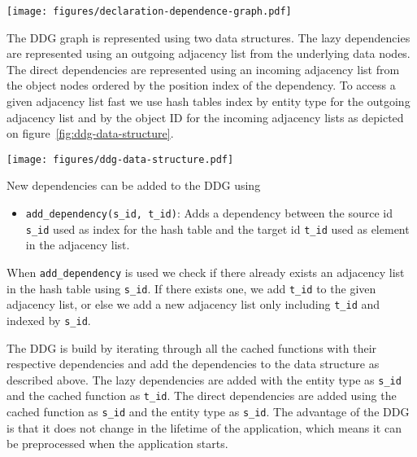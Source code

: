 \begin{figure*}[ht!]
  \centering
  \texttt{[image: figures/declaration-dependence-graph.pdf]}
  \caption{The Declaration Dependence Graph of the running example}
  \label{fig:declaration-dependence-graph}
\end{figure*}

The DDG graph is represented using two data structures. The lazy dependencies are represented using an outgoing adjacency list from the underlying data nodes. The direct dependencies are represented using an incoming adjacency list from the object nodes ordered by the position index of the dependency. To access a given adjacency list fast we use hash tables index by entity type for the outgoing adjacency list and by the object ID for the incoming adjacency lists as depicted on figure~\ref{fig:ddg-data-structure}.

\begin{figure*}[ht!]
  \centering
  \texttt{[image: figures/ddg-data-structure.pdf]}
  \caption{An illustration of the data structure representing the DDG on figure~\ref{fig:declaration-dependence-graph}}
  \label{fig:ddg-data-structure}
\end{figure*}

New dependencies can be added to the DDG using

\begin{itemize}
  \item \verb$add_dependency(s_id, t_id)$: Adds a dependency between the source id \verb$s_id$ used as index for the hash table and the target id \verb$t_id$ used as element in the adjacency list.
\end{itemize}

When \verb$add_dependency$ is used we check if there already exists an adjacency list in the hash table using \verb$s_id$. If there exists one, we add \verb$t_id$ to the given adjacency list, or else we add a new adjacency list only including \verb$t_id$ and indexed by \verb$s_id$.

The DDG is build by iterating through all the cached functions with their respective dependencies and add the dependencies to the data structure as described above. The lazy dependencies are added with the entity type as \verb$s_id$ and the cached function as \verb$t_id$. The direct dependencies are added using the cached function as \verb$s_id$ and the entity type as \verb$s_id$.  The advantage of the DDG is that it does not change in the lifetime of the application, which means it can be preprocessed when the application starts.

